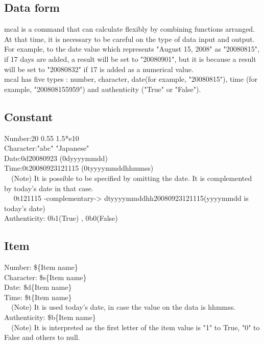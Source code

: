 \documentclass[fleqn,a4paper]{jarticle}
\begin{document}
\subsection*{Data form}

mcal is a command that can calculate flexibly by combining functions arranged.\\
At that time, it is necessary to be careful on the type of data input and output.\\
For example, to the date value which represents  "August 15, 2008" as "20080815", if 17 days are added, a result will be set to "20080901", but it is because a result will be set to "20080832" if 17 is added as a numerical value.\\
mcal has five types : number, character, date(for example, "20080815"), time (for example, "200808155959") and authenticity
("True" or "False").\\

\subsection*{Constant}
\noindent
Number:20 0.55 1.5*e10\\
Character:"abc" "Japanese"\\
Date:0d20080923 (0dyyyymmdd)\\
Time:0t20080923121115 (0tyyyymmddhhmmss)\\
　(Note) It is possible to be specified by omitting the date. It is complemented by today's date in that case.\\
　 0t121115 -complementary-> dtyyyymmddhh20080923121115(yyyymmdd is today's date)\\
Authenticity: 0b1(True) , 0b0(False) \\

\subsection*{Item}
\noindent
Number: \$\{Item name\}\\
Character: \$s\{Item name\}\\
Date: \$d\{Item name\}\\
Time: \$t\{Item name\}\\
　(Note) It is used today's date, in case the value on the data is hhmmss.\\
Authenticity: \$b\{Item name\}\\
　(Note) It is interpreted as the first letter of the item value is "1" to True, "0" to False and others to null.\\
\end{document}
